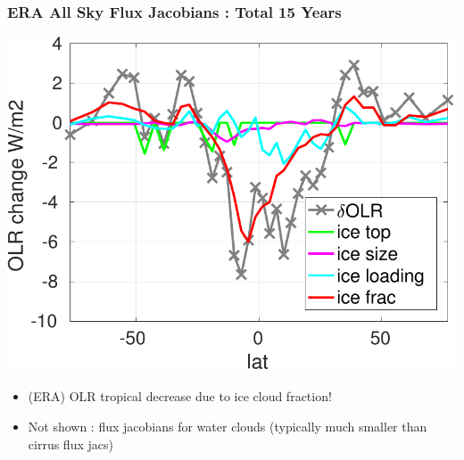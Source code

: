 \documentclass[10pt,t]{beamer}
\begin{document}
\begin{frame}
  \frametitle{ERA All Sky Flux Jacobians : Total 15 Years}
  \vspace{-0.1in}  
  \begin{center}
    \noindent\includegraphics[width=0.75\linewidth]{Figs//allsky_cloud_fluxjacs.pdf}
  \end{center}
  \vspace{-0.1in}
  \begin{itemize}
  \item (ERA) OLR tropical decrease due to ice cloud fraction!
  \item Not shown : flux jacobians for water clouds (typically much smaller than cirrus flux jacs)
  \end{itemize}
  
  
\end{frame}
\end{document}
